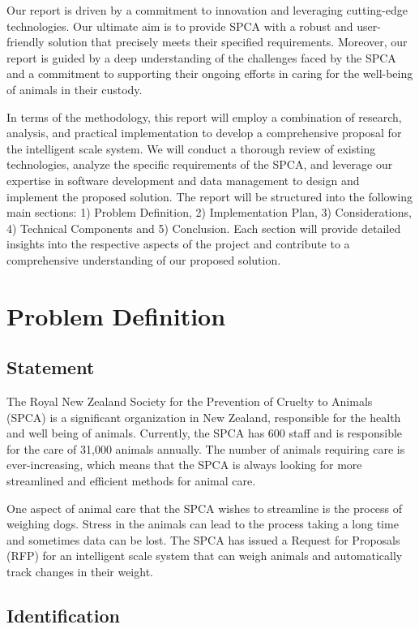 Our report is driven by a commitment to innovation and leveraging cutting-edge technologies. Our ultimate aim is to provide SPCA with a robust and user-friendly solution that precisely meets their specified requirements. Moreover, our report is guided by a deep understanding of the challenges faced by the SPCA and a commitment to supporting their ongoing efforts in caring for the well-being of animals in their custody.

In terms of the methodology, this report will employ a combination of research, analysis, and practical implementation to develop a comprehensive proposal for the intelligent scale system. We will conduct a thorough review of existing technologies, analyze the specific requirements of the SPCA, and leverage our expertise in software development and data management to design and implement the proposed solution. The report will be structured into the following main sections: 1) Problem Definition, 2) Implementation Plan, 3) Considerations, 4) Technical Components and 5) Conclusion. Each section will provide detailed insights into the respective aspects of the project and contribute to a comprehensive understanding of our proposed solution.

\chapter{Problem Definition}
\section{Statement}
The Royal New Zealand Society for the Prevention of Cruelty to Animals (SPCA) is a significant organization in New Zealand, responsible for the health and well being of animals. Currently, the SPCA has 600 staff and is responsible for the care of 31,000 animals annually. The number of animals requiring care is ever-increasing, which means that the SPCA is always looking for more streamlined and efficient methods for animal care.

One aspect of animal care that the SPCA wishes to streamline is the process of weighing dogs. Stress in the animals can lead to the process taking a long time and sometimes data can be lost. The SPCA has issued a Request for Proposals (RFP) for an intelligent scale system that can weigh animals and automatically track changes in their weight.

\section{Identification}
